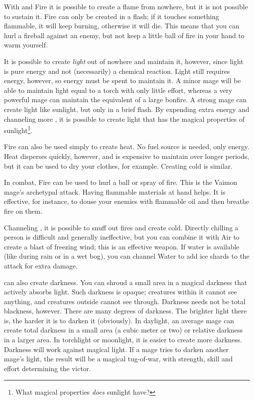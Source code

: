 With \Iquin{} and Fire it is possible to create a flame from nowhere, but it is not possible to sustain it. Fire can only be created in a flash; if it touches something flammable, it will keep burning, otherwise it will die. This means that you can hurl a fireball against an enemy, but not keep a little ball of fire in your hand to warm yourself. 

It is possible to create \emph{light} out of nowhere and maintain it, however, since light is pure energy and not (necessarily) a chemical reaction. Light still requires energy, however, so energy must be spent to maintain it. A minor mage will be able to maintain light equal to a torch with only little effort, whereas a very powerful mage can maintain the equivalent of a large bonfire. A strong mage can create light like sunlight, but only in a brief flash. By expending extra energy and channeling more \Iquin{}, it is possible to create light that has the magical properties of sunlight\footnote{What magical properties \emph{does} sunlight have?}. 

Fire can also be used simply to create heat. No fuel source is needed, only energy. Heat disperses quickly, however, and is expensive to maintain over longer periods, but it can be used to dry your clothes, for example. Creating cold is similar. 

In combat, Fire can be used to hurl a ball or spray of fire. This is the Vaimon mage's archetypal attack. Having flammable materials at hand helps. It is effective, for instance, to douse your enemies with flammable oil and then breathe fire on them. 

Channeling \Itzach{}, it is possible to snuff out fires and create cold. Directly chilling a person is difficult and generally ineffective, but you can combine it with Air to create a blast of freezing wind; this is an effective weapon. If water is available (like during rain or in a wet bog), you can channel Water to add ice shards to the attack for extra damage. 

\Itzach{} can also create darkness. You can shroud a small area in a magical darkness that actively absorbs light. Such darkness is opaque; creatures within it cannot see anything, and creatures outside cannot see through. Darkness needs not be total blackness, however. There are many degrees of darkness. The brighter light there is, the harder it is to darken it (obviously). In daylight, an average mage can create total darkness in a small area (a cubic meter or two) or relative darkness in a larger area. In torchlight or moonlight, it is easier to create more darkness. Darkness will work against magical light. If a mage tries to darken another mage's light, the result will be a magical tug-of-war, with strength, skill and effort determining the victor. 



